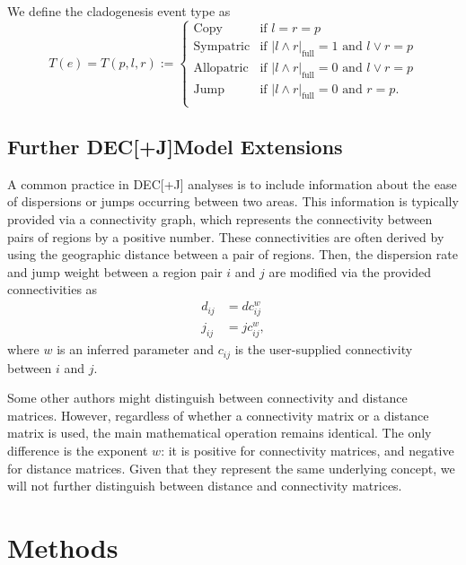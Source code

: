 \documentclass[a4paper]{article}
\newcommand{\CountFull}[1]{|#1|_\text{full}}
\newcommand{\decj}{DEC[+J]}
\newcommand{\rand}[2]{#1 \land #2}
\newcommand{\ror}[2]{#1 \lor #2}
\begin{document}
We define the cladogenesis event type as
\begin{equation}
T(e) = T(p, l, r) := 
\begin{cases}
  \text{Copy} & \text{if }l = r = p \\ 
  \text{Sympatric} & \text{if } \CountFull{\rand{l}{r}} = 1 \text{ and } \ror{l}{r} = p \\ 
  \text{Allopatric} & \text{if } \CountFull{\rand{l}{r}} = 0 \text{ and } \ror{l}{r} = p   \\ 
  \text{Jump} & \text{if } \CountFull{\rand{l}{r}} = 0 \text{ and } r = p. \\ 
\end{cases}
\label{eq:clad-test}
\end{equation}

\subsection{Further \decj Model Extensions}

A common practice in \decj{} analyses is to include information about the ease of dispersions or jumps occurring
between two areas.
This information is typically provided via a connectivity graph, which represents the connectivity between pairs of regions by a
positive number.
These connectivities are often derived by using the geographic distance between a pair of regions.
Then, the dispersion rate and jump weight between a region pair $i$ and $j$ are modified via the provided connectivities
as
\begin{align*}
  d_{ij} &= d c_{ij}^w \\
  j_{ij} &= j c_{ij}^w,
\end{align*}
where $w$ is an inferred parameter and $c_{ij}$ is the user-supplied connectivity between $i$ and $j$.

Some other authors might distinguish between connectivity and distance matrices.
However, regardless of whether a connectivity matrix or a distance matrix is used, the main mathematical operation remains identical.
The only difference is the exponent $w$: it is positive for connectivity matrices, and negative for
distance matrices.
Given that they represent the same underlying concept, we will not further distinguish between distance and connectivity matrices.

\section{Methods}
\end{document}
